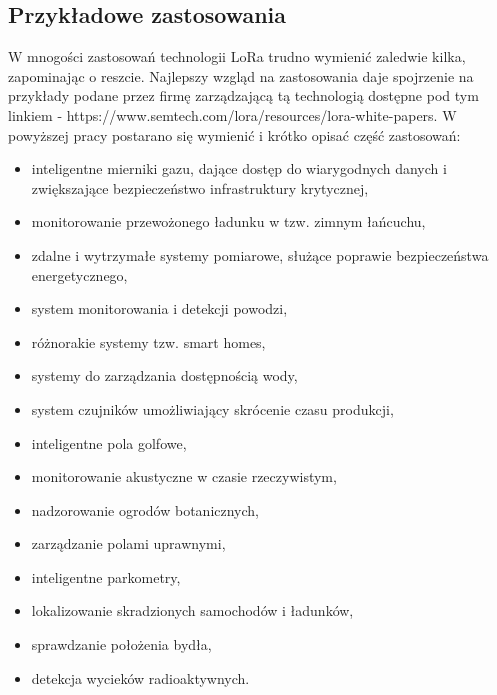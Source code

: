 \subsection{Przykładowe zastosowania}
W mnogości zastosowań technologii LoRa trudno wymienić zaledwie kilka, zapominając o reszcie. Najlepszy wzgląd na zastosowania daje spojrzenie na przykłady podane przez firmę zarządzającą tą technologią dostępne pod tym linkiem - https://www.semtech.com/lora/resources/lora-white-papers.
W powyższej pracy postarano się wymienić i krótko opisać część zastosowań:
\begin{itemize}
	\item inteligentne mierniki gazu, dające dostęp do wiarygodnych danych i zwiększające bezpieczeństwo infrastruktury krytycznej,
	\item monitorowanie przewożonego ładunku w tzw. zimnym łańcuchu,
	\item zdalne i wytrzymałe systemy pomiarowe, służące poprawie bezpieczeństwa energetycznego,
	\item system monitorowania i detekcji powodzi,
	\item różnorakie systemy tzw. smart homes,
	\item systemy do zarządzania dostępnością wody,
	\item system czujników umożliwiający skrócenie czasu produkcji,
	\item inteligentne pola golfowe,
	\item monitorowanie akustyczne w czasie rzeczywistym,
	\item nadzorowanie ogrodów botanicznych,
	\item zarządzanie polami uprawnymi,
	\item inteligentne parkometry,
	\item lokalizowanie skradzionych samochodów i ładunków,
	\item sprawdzanie położenia bydła,
	\item detekcja wycieków radioaktywnych.
\end{itemize}
